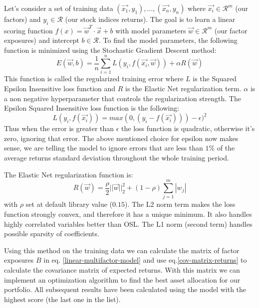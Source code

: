 Let's consider a set of training data $(\vec{x_1}, y_1),\dots,(\vec{x_n}, y_n)$ where $\vec{x_i} \in \mathcal{R}^m$ (our factors) and $y_i \in \mathcal{R}$ (our stock indices returns). The goal is to learn a linear scoring function $f(x) = \vec{w}^{T}\cdot\vec{x} + b$ with model parameters $\vec{w} \in \mathcal{R}^m$ (our factor exposures) and intercept $b \in \mathcal{R}$.
To find the model parameters, the following function is minimized using the Stochastic Gradient Descent method:
\begin{equation}
	E(\vec{w},b) = \frac{1}{n} \sum_{i=1}^n L(y_i, f(\vec{x_i}, \vec{w})) + \alpha R(\vec{w})
	\label{reg-train-error}
\end{equation}
This function is called the regularized training error where $L$ is the Squared Epsilon Insensitive loss function and $R$ is the Elastic Net regularization term. $\alpha$ is a non negative hyperparameter that controls the regularization strength.
The Epsilon Squared Insensitive loss function is the following:
\begin{equation}
	L(y_i, f(\vec{x_i})) = max(0, (y_i - f(\vec{x_i}))) - \epsilon)^2
	\label{sq-ins-epsilon}
\end{equation}
Thus when the error is greater than $\epsilon$ the loss function is quadratic, otherwise it's zero, ignoring that error. The above mentioned choice for epsilon now makes sense, we are telling the model to ignore errors that are less than $1\%$ of the average returns standard deviation throughout the whole training period.

The Elastic Net regularization function is:
\begin{equation}
	R(\vec{w}) = \frac{\rho}{2} ||\vec{w}||_{2}^2 + (1-\rho)\sum_{j = 1}^{m} |w_j|
\end{equation}
with $\rho$ set at default library value ($0.15$). The L2 norm term makes the loss function strongly convex, and therefore it has a unique minimum. It also handles highly correlated variables better than OSL. The L1 norm (second term) handles possible sparsity of coefficients.

Using this method on the training data we can calculate the matrix of factor exposures $B$ in eq. \eqref{linear-multifactor-model} and use eq.\eqref{cov-matrix-returns} to calculate the covariance matrix of expected returns. With this matrix we can implement an optimization algorithm to find the best asset allocation for our portfolio.
All subsequent results have been calculated using the model with the highest score (the last one in the list).

